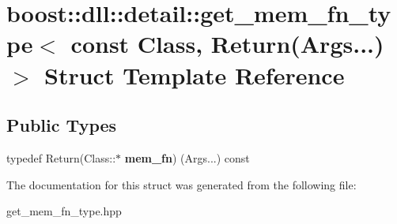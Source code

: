 \hypertarget{a00133}{}\section{boost\+:\+:dll\+:\+:detail\+:\+:get\+\_\+mem\+\_\+fn\+\_\+type$<$ const Class, Return(Args...)$>$ Struct Template Reference}
\label{a00133}
\subsection*{Public Types}
\begin{DoxyCompactItemize}
\item 
typedef Return(Class\+::$\ast$ {\bfseries mem\+\_\+fn}) (Args...) const \hypertarget{a00133_adf447255cd56294e7be49b0ec1399aa8}{}\label{a00133_adf447255cd56294e7be49b0ec1399aa8}

\end{DoxyCompactItemize}


The documentation for this struct was generated from the following file\+:\begin{DoxyCompactItemize}
\item 
get\+\_\+mem\+\_\+fn\+\_\+type.\+hpp\end{DoxyCompactItemize}

